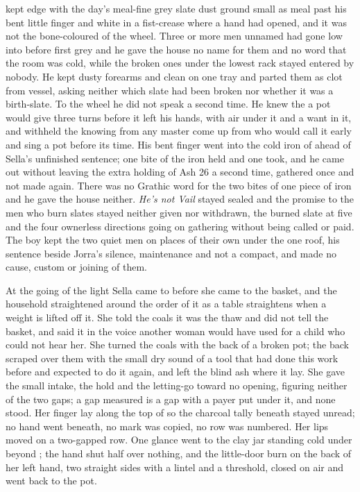  kept  edge with the day's meal-fine grey slate dust ground small as meal past his bent little finger and white in a fist-crease where a hand had opened, and it was not the bone-coloured  of the wheel. Three or more men unnamed had gone low into  before first grey and he gave the house no name for them and no word that the room was cold, while the broken ones under the lowest rack stayed entered by nobody. He kept dusty forearms and clean on one tray and parted them as clot from vessel, asking neither which slate had been broken nor whether it was a birth-slate. To the wheel he did not speak a second time. He knew the  a pot would give three turns before it left his hands, with air under it and a want in it, and withheld the knowing from any master come up from  who would call it early and sing a pot before its time. His bent finger went into the cold iron of  ahead of Sella's unfinished sentence; one bite of the iron held and one took, and he came out without leaving the extra holding of Ash 26 a second time, gathered once and not made again. There was no Grathic word for the two bites of one piece of iron and he gave the house neither. \emph{He's not Vail} stayed sealed and the promise to the men who burn slates stayed neither given nor withdrawn, the burned slate at five and the four ownerless directions going on gathering without being called or paid. The boy kept the two quiet men on places of their own under the one roof, his sentence beside Jorra's silence, maintenance and not a compact, and made no cause, custom or joining of them.

\scenebreak

At the going of the light Sella came to  before she came to the basket, and the household straightened around the order of it as a table straightens when a weight is lifted off it. She told the coals it was the thaw and did not tell the basket, and said it in the voice another woman would have used for a child who could not hear her. She turned the coals with the back of a broken pot; the back scraped over them with the small dry sound of a tool that had done this work before and expected to do it again, and left the blind ash where it lay. She gave the small intake, the hold and the letting-go toward no opening, figuring neither of the two gaps; a gap measured is a gap with a payer put under it, and none stood. Her finger lay along the top of  so the charcoal tally beneath stayed unread; no hand went beneath, no mark was copied, no row was numbered. Her lips moved on a two-gapped row. One glance went to the clay jar standing cold under  beyond ; the hand shut half over nothing, and the little-door burn on the back of her left hand, two straight sides with a lintel and a threshold, closed on air and went back to the pot.

